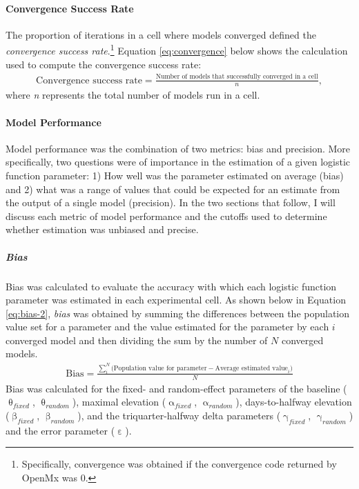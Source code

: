 \documentclass[
12pt, %
twoside,
english]{guelphthesis}
\begin{document}
\hypertarget{convergence-success-rate}{%
\paragraph{Convergence Success Rate}\label{convergence-success-rate}}

The proportion of iterations in a cell where models converged defined
the \emph{convergence success rate}.\footnote{Specifically, convergence was obtained if the convergence code returned by OpenMx was 0.} Equation \eqref{eq:convergence} below shows the calculation used to compute the convergence success rate:
\begin{align}
  \text{Convergence success rate} =  \frac{\text{Number of models that successfully converged in a cell}}{n},
  \label{eq:convergence} 
\end{align}
\noindent where \emph{n} represents the total number of models run in a cell.

\hypertarget{model-performance-1}{%
\paragraph{Model Performance}\label{model-performance-1}}

Model performance was the combination of two metrics: bias and precision. More specifically, two questions were of importance in the estimation of a given logistic function parameter: 1) How well was the parameter estimated on average (bias) and 2) what was a range of values that could be expected for an estimate from the output of a single model (precision). In the two sections that follow, I will discuss each metric of model performance and the cutoffs used to determine whether estimation was unbiased and precise.

\hypertarget{bias}{%
\subparagraph{Bias}\label{bias}}

Bias was calculated to evaluate the accuracy with which each logistic
function parameter was estimated in each experimental cell. As shown below in Equation
\eqref{eq:bias-2}, \emph{bias} was obtained by summing the differences
between the population value set for a parameter and the value estimated for the parameter by each \(i\) converged model and then dividing the sum by the number of \(N\) converged models.
\begin{align}
  \text{Bias} = \frac{\sum_i^N\text{(Population value for parameter} - \text{Average estimated value}_i)}{N}
  \label{eq:bias-2} 
\end{align}
\noindent Bias was calculated for the fixed- and random-effect parameters of the baseline (\(\uptheta_{fixed}\), \(\uptheta_{random}\)), maximal elevation (\(\upalpha_{fixed}\), \(\upalpha_{random}\)), days-to-halfway elevation (\(\upbeta_{fixed}\), \(\upbeta_{random}\)), and the triquarter-halfway delta parameters (\(\upgamma_{fixed}\), \(\upgamma_{random}\)) and the error parameter (\(\upepsilon\)).
\end{document}
